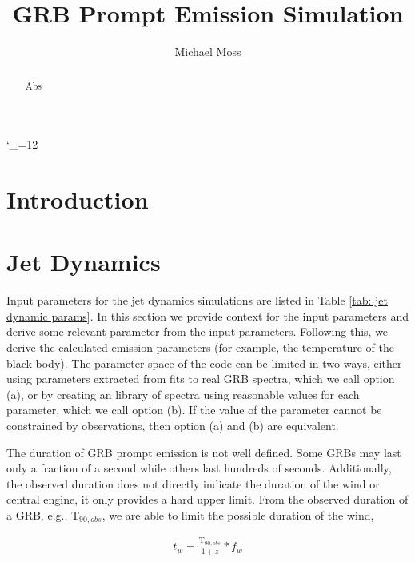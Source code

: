 \documentclass[linenumbers,twocolumn]{aastex631}
\def\upsubscripts{\catcode`\_=12 } \def\normalsubscripts{\catcode`\_=8 }
\begin{document}
\upsubscripts
\title{GRB Prompt Emission Simulation}

\author{Michael Moss}




\begin{abstract}
Abs
\end{abstract}


\section{Introduction} \label{sec:intro}
\section{Jet Dynamics} \label{sec:jet dynamics}

Input parameters for the jet dynamics simulations are listed in Table \ref{tab: jet dynamic params}. In this section we provide context for the input parameters and derive some relevant parameter from the input parameters. Following this, we derive the calculated emission parameters (for example, the temperature of the black body). The parameter space of the code can be limited in two ways, either using parameters extracted from fits to real GRB spectra, which we call option (a), or by creating an library of spectra using reasonable values for each parameter, which we call option (b). If the value of the parameter cannot be constrained by observations, then option (a) and (b) are equivalent.

The duration of GRB prompt emission is not well defined. Some GRBs may last only a fraction of a second while others last hundreds of seconds. Additionally, the observed duration does not directly indicate the duration of the wind or central engine, it only provides a hard upper limit. From the observed duration of a GRB, e.g., T$_{90,obs}$, we are able to limit the possible duration of the wind, 

\begin{align}
	t_w = \frac{\text{T}_{90,obs}}{1+z} * f_w
\end{align}
\end{document}
